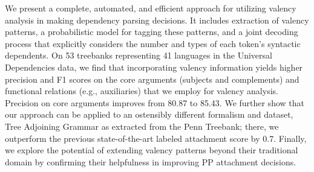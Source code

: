 We present a complete, automated, and efficient approach for utilizing valency analysis in making dependency parsing decisions. It includes extraction of valency patterns, a probabilistic model for tagging these patterns, and a joint decoding process that explicitly considers the number and types of each token's syntactic dependents. On 53 treebanks representing 41 languages in the Universal Dependencies data, we find that incorporating valency information yields higher precision and F1 scores on the core arguments (subjects and complements) and functional relations (e.g., auxiliaries) that we employ for valency analysis. Precision on core arguments improves from 80.87 to 85.43. We further show that our approach can be applied to an ostensibly different formalism and dataset, Tree Adjoining Grammar as extracted from the Penn Treebank; there, we outperform the previous state-of-the-art labeled attachment score by 0.7. Finally, we explore the potential of extending valency patterns beyond their traditional domain by confirming their helpfulness in improving PP attachment decisions.
